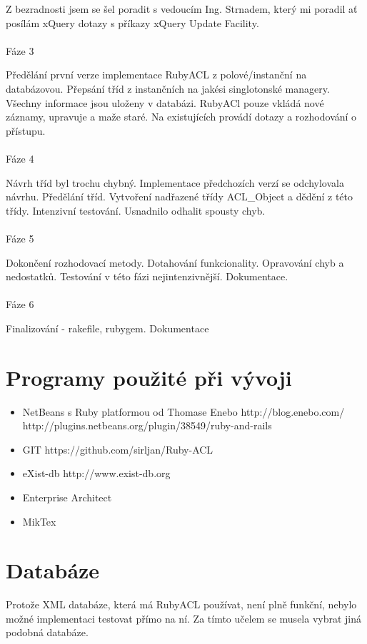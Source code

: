 Z bezradnosti jsem se šel poradit s vedoucím Ing. Strnadem, který mi poradil ať posílám xQuery dotazy s příkazy xQuery Update Facility.
\\
\\
\noindent Fáze 3

\noindent Předělání první verze implementace RubyACL z polové/instanční na databázovou. Přepsání tříd z instančních na jakési singlotonské managery. Všechny informace jsou uloženy v databázi. RubyACl pouze vkládá nové záznamy, upravuje a maže staré. Na existujících provádí dotazy a rozhodování o přístupu.
\\
\\
\noindent Fáze 4

\noindent Návrh tříd byl trochu chybný. Implementace předchozích verzí se odchylovala návrhu. Předělání tříd. Vytvoření nadřazené třídy ACL\_Object a dědění z této třídy. Intenzivní testování. Usnadnilo odhalit spousty chyb.
\\
\\
\noindent Fáze 5

\noindent Dokončení rozhodovací metody. Dotahování funkcionality. Opravování chyb a nedostatků. Testování v této fázi nejintenzivnější. Dokumentace.
\\
\\
\noindent Fáze 6

\noindent Finalizování - rakefile, rubygem. Dokumentace


\section{Programy použité při vývoji}
\begin{itemize}
\item NetBeans s Ruby platformou od Thomase Enebo
http://blog.enebo.com/
http://plugins.netbeans.org/plugin/38549/ruby-and-rails
\item GIT
https://github.com/sirljan/Ruby-ACL
\item eXist-db
http://www.exist-db.org
\item Enterprise Architect
\item MikTex
\end{itemize}
\section{Databáze}
Protože XML databáze, která má RubyACL používat, není plně funkční, nebylo možné implementaci testovat přímo na ní. Za tímto učelem se musela vybrat jiná podobná databáze.

